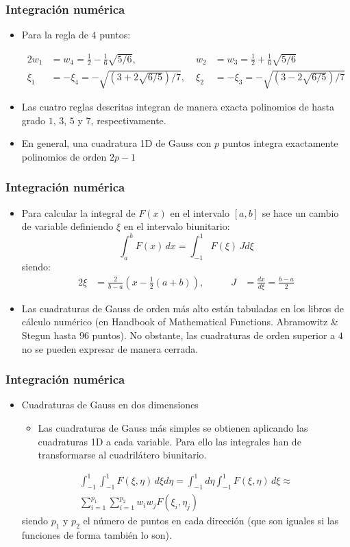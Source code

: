 \documentclass[10pt, aspectratio=43]{beamer}
\begin{document}
\begin{frame}
\frametitle{Integración numérica}
\begin{itemize}
\item Para la regla de $4$ puntos:
\begin{small}
\begin{alignat*}{2}
w_1&=w_4=\frac{1}{2}-\frac{1}{6}\sqrt{5/6}, \; &
w_2&=w_3=\frac{1}{2}+\frac{1}{6}\sqrt{5/6}  \\
\xi_1&=-\xi_4=-\sqrt{(3+2\sqrt{6/5})/7}, \; &
\xi_2&=-\xi_3=-\sqrt{(3-2\sqrt{6/5})/7}
\end{alignat*}
\end{small}
\item Las cuatro reglas descritas integran de manera exacta polinomios de hasta
grado $1$, $3$, $5$ y $7$, respectivamente.
\item En general, una cuadratura 1D de Gauss con $p$ puntos integra
exactamente polinomios de orden $2p-1$
\end{itemize}
\end{frame}
\begin{frame}
\frametitle{Integración numérica}
\begin{itemize}
\item Para calcular la integral de $F(x)$ en el intervalo $[a,b]$ se hace
un cambio de variable definiendo $\xi$ en el intervalo biunitario:
$$
\int_a^b F(x) \, dx = \int_{-1}^1 F(\xi) \, J d\xi
$$
siendo:
\begin{alignat*}{2}
\xi&=\frac{2}{b-a} \left( x-\frac{1}{2} (a+b) \right), \qquad &
J&=\frac{dx}{d\xi}=\frac{b-a}{2}
\end{alignat*}
\item Las cuadraturas de Gauss de orden más alto están tabuladas en los
libros de cálculo numérico (en {\sc Handbook of Mathematical Functions.
Abramowitz \& Stegun} hasta 96 puntos). No obstante, las cuadraturas de 
orden superior a $4$ no se pueden expresar de manera cerrada.
\end{itemize}
\end{frame}
\begin{frame}
\frametitle{Integración numérica}
\begin{itemize}
\item Cuadraturas de Gauss en dos dimensiones
\begin{itemize}
\item Las cuadraturas de Gauss más simples se obtienen aplicando las
cuadraturas 1D a cada variable. Para ello las integrales han de transformarse
al cuadrilátero biunitario.
\end{itemize}
\begin{multline*}
\int_{-1}^1 \int_{-1}^1 F(\xi,\eta) \, d \xi d\eta=
\int_{-1}^1 d \eta \int_{-1}^1 F(\xi,\eta) \, d \xi \approx \\
\sum_{i=1}^{p_1} \sum_{i=1}^{p_2} w_i w_j F(\xi_i,\eta_j)
\end{multline*}
siendo $p_1$ y $p_2$ el número de puntos en cada dirección (que son
iguales si las funciones de forma también lo son).
\end{itemize}
\end{frame}
\end{document}
